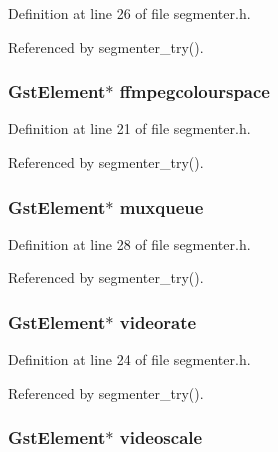\-Definition at line 26 of file segmenter.\-h.



\-Referenced by segmenter\-\_\-try().

\hypertarget{struct_video_bag_ae45b3f4ec98e5e429bf58f9ded85c0b4}{
\subsubsection[{ffmpegcolourspace}]{\setlength{\rightskip}{0pt plus 5cm}\-Gst\-Element$\ast$ {\bf ffmpegcolourspace}}}\label{struct_video_bag_ae45b3f4ec98e5e429bf58f9ded85c0b4}


\-Definition at line 21 of file segmenter.\-h.



\-Referenced by segmenter\-\_\-try().

\hypertarget{struct_video_bag_a917a2aa09433aafbcda72454d53c196f}{
\subsubsection[{muxqueue}]{\setlength{\rightskip}{0pt plus 5cm}\-Gst\-Element$\ast$ {\bf muxqueue}}}\label{struct_video_bag_a917a2aa09433aafbcda72454d53c196f}


\-Definition at line 28 of file segmenter.\-h.



\-Referenced by segmenter\-\_\-try().

\hypertarget{struct_video_bag_a14ada90c504b234ba99ef9a409d6a52f}{
\subsubsection[{videorate}]{\setlength{\rightskip}{0pt plus 5cm}\-Gst\-Element$\ast$ {\bf videorate}}}\label{struct_video_bag_a14ada90c504b234ba99ef9a409d6a52f}


\-Definition at line 24 of file segmenter.\-h.



\-Referenced by segmenter\-\_\-try().

\hypertarget{struct_video_bag_a87efc6ab0a3185089398de023439e26b}{
\subsubsection[{videoscale}]{\setlength{\rightskip}{0pt plus 5cm}\-Gst\-Element$\ast$ {\bf videoscale}}}\label{struct_video_bag_a87efc6ab0a3185089398de023439e26b}


